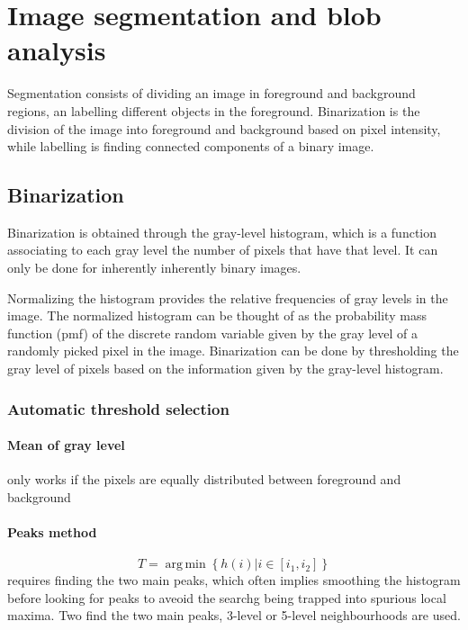 \documentclass{article}
\DeclareMathOperator*{\argmin}{arg\,min}
\begin{document}
\section{Image segmentation and blob analysis} 
Segmentation consists of dividing an image in foreground and background regions, an labelling different objects in the foreground.
Binarization is the division of the image into foreground and background based on pixel intensity, while labelling is finding connected components of a binary image. 
\subsection{Binarization}
Binarization is obtained through the gray-level histogram, which is a function associating to each gray level the number of pixels that have that level. It can only be done for inherently inherently binary images. 

Normalizing the histogram provides the relative frequencies of gray levels in the image. The normalized histogram can be thought of as the probability mass function (pmf) of the discrete random variable given by the gray level of a randomly picked pixel in the image. Binarization can be done by thresholding the gray level of pixels based on the information given by the gray-level histogram. 

\subsubsection{Automatic threshold selection}
\paragraph{Mean of gray level}
only works if the pixels are equally distributed between foreground and background
\paragraph{Peaks method}
\[
    T = \argmin\left\{h(i) | i \in [i_1, i_2]\right\}
\]
requires finding the two main peaks, which often implies smoothing the histogram before looking for peaks to aveoid the searchg being trapped into spurious local maxima. Two find the two main peaks, 3-level or 5-level neighbourhoods are used.
\end{document}
